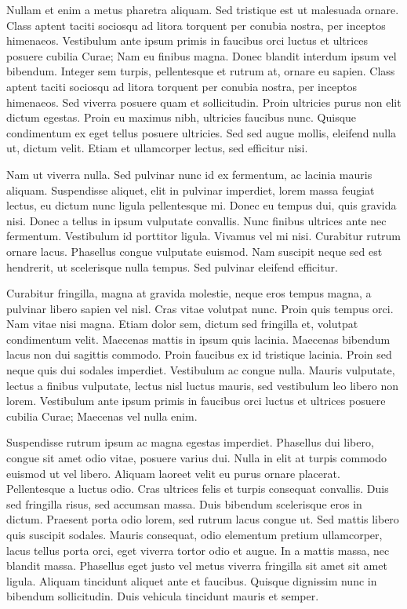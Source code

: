 Nullam et enim a metus pharetra aliquam. Sed tristique est ut malesuada ornare. Class aptent taciti sociosqu ad litora torquent per conubia nostra, per inceptos himenaeos. Vestibulum ante ipsum primis in faucibus orci luctus et ultrices posuere cubilia Curae; Nam eu finibus magna. Donec blandit interdum ipsum vel bibendum. Integer sem turpis, pellentesque et rutrum at, ornare eu sapien. Class aptent taciti sociosqu ad litora torquent per conubia nostra, per inceptos himenaeos. Sed viverra posuere quam et sollicitudin. Proin ultricies purus non elit dictum egestas. Proin eu maximus nibh, ultricies faucibus nunc. Quisque condimentum ex eget tellus posuere ultricies. Sed sed augue mollis, eleifend nulla ut, dictum velit. Etiam et ullamcorper lectus, sed efficitur nisi.

Nam ut viverra nulla. Sed pulvinar nunc id ex fermentum, ac lacinia mauris aliquam. Suspendisse aliquet, elit in pulvinar imperdiet, lorem massa feugiat lectus, eu dictum nunc ligula pellentesque mi. Donec eu tempus dui, quis gravida nisi. Donec a tellus in ipsum vulputate convallis. Nunc finibus ultrices ante nec fermentum. Vestibulum id porttitor ligula. Vivamus vel mi nisi. Curabitur rutrum ornare lacus. Phasellus congue vulputate euismod. Nam suscipit neque sed est hendrerit, ut scelerisque nulla tempus. Sed pulvinar eleifend efficitur.

Curabitur fringilla, magna at gravida molestie, neque eros tempus magna, a pulvinar libero sapien vel nisl. Cras vitae volutpat nunc. Proin quis tempus orci. Nam vitae nisi magna. Etiam dolor sem, dictum sed fringilla et, volutpat condimentum velit. Maecenas mattis in ipsum quis lacinia. Maecenas bibendum lacus non dui sagittis commodo. Proin faucibus ex id tristique lacinia. Proin sed neque quis dui sodales imperdiet. Vestibulum ac congue nulla. Mauris vulputate, lectus a finibus vulputate, lectus nisl luctus mauris, sed vestibulum leo libero non lorem. Vestibulum ante ipsum primis in faucibus orci luctus et ultrices posuere cubilia Curae; Maecenas vel nulla enim.

Suspendisse rutrum ipsum ac magna egestas imperdiet. Phasellus dui libero, congue sit amet odio vitae, posuere varius dui. Nulla in elit at turpis commodo euismod ut vel libero. Aliquam laoreet velit eu purus ornare placerat. Pellentesque a luctus odio. Cras ultrices felis et turpis consequat convallis. Duis sed fringilla risus, sed accumsan massa. Duis bibendum scelerisque eros in dictum. Praesent porta odio lorem, sed rutrum lacus congue ut. Sed mattis libero quis suscipit sodales. Mauris consequat, odio elementum pretium ullamcorper, lacus tellus porta orci, eget viverra tortor odio et augue. In a mattis massa, nec blandit massa. Phasellus eget justo vel metus viverra fringilla sit amet sit amet ligula. Aliquam tincidunt aliquet ante et faucibus. Quisque dignissim nunc in bibendum sollicitudin. Duis vehicula tincidunt mauris et semper.

